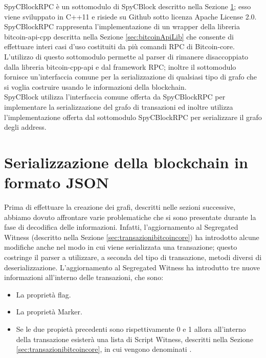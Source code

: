 SpyCBlockRPC è un sottomodulo di SpyCBlock descritto nella Sezione \ref{sec:spycblock}; esso viene sviluppato in C++11 e risiede su Github sotto licenza Apache License 2.0.\\
SpyCBlockRPC rappresenta l'implementazione di un wrapper della libreria bitcoin-api-cpp descritta nella Sezione \ref{sec:bitcoinApiLib} che consente di effettuare interi casi d'uso costituiti da più comandi RPC di Bitcoin-core.
L'utilizzo di questo sottomodulo permette al parser di rimanere disaccoppiato dalla libreria bitcoin-cpp-api e dal framework RPC; inoltre il sottomodulo fornisce un'interfaccia comune per la serializzazione di qualsiasi tipo di grafo che si voglia costruire usando le informazioni della blockchain.\\
SpyCBlock utilizza l'interfaccia comune offerta da SpyCBlockRPC per implementare la serializzazione del grafo di transazioni ed inoltre utilizza l'implementazione offerta dal sottomodulo SpyCBlockRPC per serializzare il grafo degli address.

\section{Serializzazione della blockchain in formato JSON} \label{sec:spycblock}

Prima di effettuare la creazione dei grafi, descritti nelle sezioni successive, abbiamo dovuto affrontare varie problematiche che si sono presentate durante la fase di decodifica delle informazioni. Infatti, l'aggiornamento al Segregated Witness (descritto nella Sezione \ref{sec:transazionibitcoincore}) ha introdotto alcune modifiche anche nel modo in cui viene serializzata una transazione; questo costringe il parser a utilizzare, a seconda del tipo di transazione, metodi diversi di deserializzazione.
L'aggiornamento al Segregated Witness ha introdutto tre nuove informazioni all'interno delle transazioni, che sono:
\begin{itemize}
  \item La proprietà flag.
  \item La proprietà Marker.
  \item Se le due propietà precedenti sono rispettivamente 0 e 1 allora all'interno della transazione esisterà una lista di Script Witness, descritti nella Sezione \ref{sec:transazionibitcoincore}, in cui vengono denominati .
\end{itemize}


